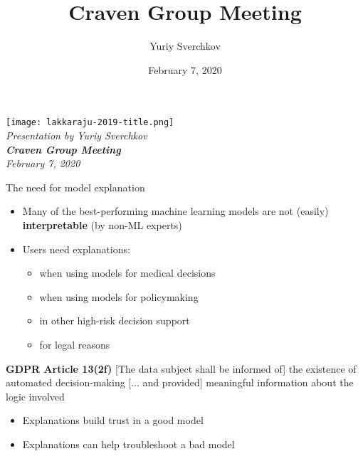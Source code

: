 \documentclass[aspectratio=169]{beamer}
\title{Craven Group Meeting}
\author{Yuriy Sverchkov}
\institute{University of Wisconsin--Madison}
\date{February 7, 2020}
\begin{document}
	
	\begin{frame}[plain]
		\raggedleft
		\texttt{[image: lakkaraju-2019-title.png]} \\
		\vfill
		\it Presentation by Yuriy Sverchkov \\
		\textbf{Craven Group Meeting} \\ February 7, 2020
	\end{frame}


	\begin{frame}{The need for model explanation}
		
		\begin{itemize}
			\item Many of the best-performing machine learning models are not (easily) \textbf{interpretable} (by non-ML experts) \pause
			\item Users need explanations:
			\begin{itemize}
				\item when using models for medical decisions
				\item when using models for policymaking
				\item in other high-risk decision support
				\item for legal reasons
			\end{itemize}
		\end{itemize}
		\pause
		
		\textbf{GDPR Article 13(2f)} [The data subject shall be informed of] the existence of automated decision-making [... and provided] meaningful information about the logic involved
		\pause
		
		\begin{itemize}
			\item Explanations build trust in a good model
			\item Explanations can help troubleshoot a bad model
		\end{itemize}
	\end{frame}
	
\end{document}
